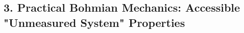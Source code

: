 \documentclass[11pt, a4paper]{article} %
\begin{document}

 
\subsection*{3. Practical Bohmian Mechanics: Accessible "Unmeasured System" Properties}
\end{document}
